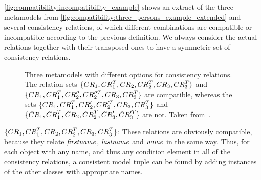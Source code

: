 
\begin{example}
\autoref{fig:compatibility:incompatibility_example} shows an extract of the three metamodels from \autoref{fig:compatibility:three_persons_example_extended} and several consistency relations, of which different combinations are compatible or incompatible according to the previous definition.
We always consider the actual relations together with their transposed ones to have a symmetric set of consistency relations.

\begin{figure}
    \centering
    
    \caption[Different incompatibility scenarios]{Three metamodels with different options for consistency relations. The relation sets $\setted{\consistencyrelation{CR}{1}, \consistencyrelation{CR}{1}^T,\consistencyrelation{CR}{2}, \consistencyrelation{CR}{2}^T, \consistencyrelation{CR}{3}, \consistencyrelation{CR}{3}^T}$ and $\setted{\consistencyrelation{CR}{1}, \consistencyrelation{CR}{1}^T, \consistencyrelation{CR}{2}'', \consistencyrelation{CR}{2}''^T, \consistencyrelation{CR}{3}, \consistencyrelation{CR}{3}^T}$ are compatible, whereas the sets $\setted{\consistencyrelation{CR}{1}, \consistencyrelation{CR}{1}^T, \consistencyrelation{CR}{2}', \consistencyrelation{CR}{2}'^T, \consistencyrelation{CR}{3}, \consistencyrelation{CR}{3}^T}$ and $\setted{\consistencyrelation{CR}{1}, \consistencyrelation{CR}{1}^T, \consistencyrelation{CR}{2}, \consistencyrelation{CR}{2}^T, \consistencyrelation{CR}{3}', \consistencyrelation{CR}{3}'^T}$ are not. Taken from~.}
    \label{fig:compatibility:incompatibility_example}
\end{figure}

\begin{properdescription}
\item[$\setted{\consistencyrelation{CR}{1}, \consistencyrelation{CR}{1}^T,\consistencyrelation{CR}{2}, \consistencyrelation{CR}{2}^T, \consistencyrelation{CR}{3}, \consistencyrelation{CR}{3}^T}$:]
These relations are obviously compatible, because they relate $\mathit{firstname}$, $\mathit{lastname}$ and $\mathit{name}$ in the same way. Thus, for each object with any name, and thus any condition element in all of the consistency relations, a consistent model tuple can be found by adding instances of the other classes with appropriate names.


\end{properdescription}
\end{example}
